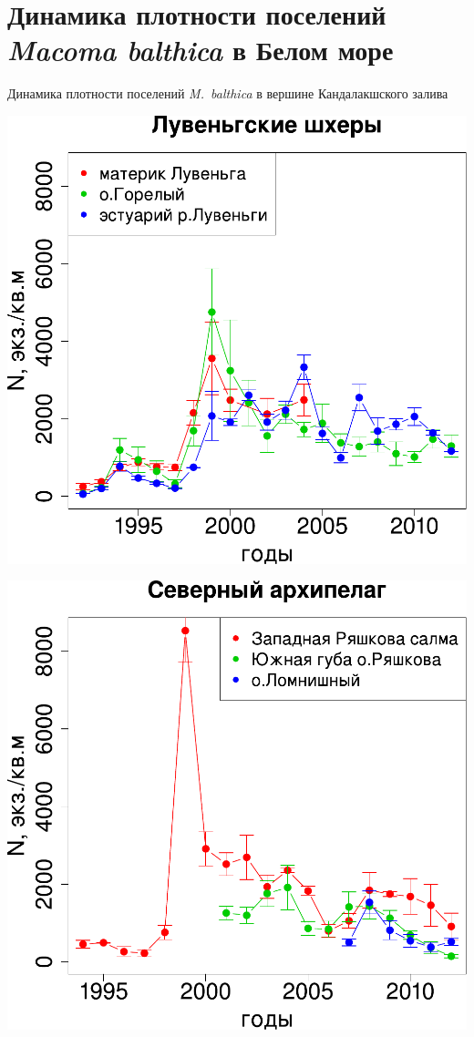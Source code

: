 \documentclass{beamer}
\begin{document}
		\section[Динамика численности]{Динамика плотности поселений {\it Macoma balthica} в Белом море}
\begin{frame}{Динамика плотности поселений {\it M.~balthica} в вершине Кандалакшского залива}
	\begin{minipage}[t]{.49\linewidth}
		\begin{center}
			\includegraphics[width=\textwidth]{N2_dynamic_Luvenga_big1.pdf}
		\end{center}
	\end{minipage}
%
	\begin{minipage}[t]{.49\linewidth}
		\begin{center}
			\includegraphics[width=\textwidth]{N2_dynamic_North_big1.pdf}

\end{center}
\end{minipage}
\end{frame}
\end{document}
